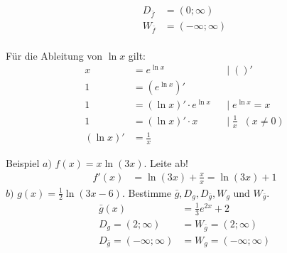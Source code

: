 \documentclass{article}
\begin{document}
\begin{figure}[H]
    \centering
\end{figure}
\begin{align*}
    D_{\bar{f}} &= (0;\infty) \\
    W_{\bar{f}} &= (-\infty;\infty) \\
\end{align*}

Für die Ableitung von $\ln x$ gilt:
\begin{align*}
    && x &= e^{\ln x} & &|\; ()' &&\\
    && 1 &= \left(e^{\ln x}\right)' &&\\
    && 1 &= \left(\ln x\right)' \cdot e^{\ln x} & &|\; e^{\ln x} = x &&\\
    && 1 &= \left(\ln x\right)' \cdot x & &|\; \frac{1}{x}\;\;(x \not= 0) &&\\
    && \left(\ln x\right)' &= \frac{1}{x}
\end{align*}
\newpage

\begin{boxx}[DarkBlue]{Beispiel}
    $a)$\hspace{3mm} $f(x) = x \ln(3x)$. Leite ab!
    \begin{align*}
        f'(x) &= \ln(3x) + \frac{x}{x} = \ln(3x) + 1
    \end{align*}
    $b)$\hspace{3mm} $\displaystyle g(x) = \frac{1}{2} \ln(3x-6)$. Bestimme $\bar{g}, D_g, D_{\bar{g}}, W_g$ und $W_{\bar{g}}$.
    \begin{align*}
        \bar{g}(x) &= \frac{1}{3} e^{2x} + 2 \\
        D_g = (2;\infty) &= W_{\bar{g}} = (2;\infty) \\
        D_{\bar{g}} = (-\infty;\infty) &= W_{g} = (-\infty;\infty) \\
    \end{align*}
\end{boxx}
\end{document}

